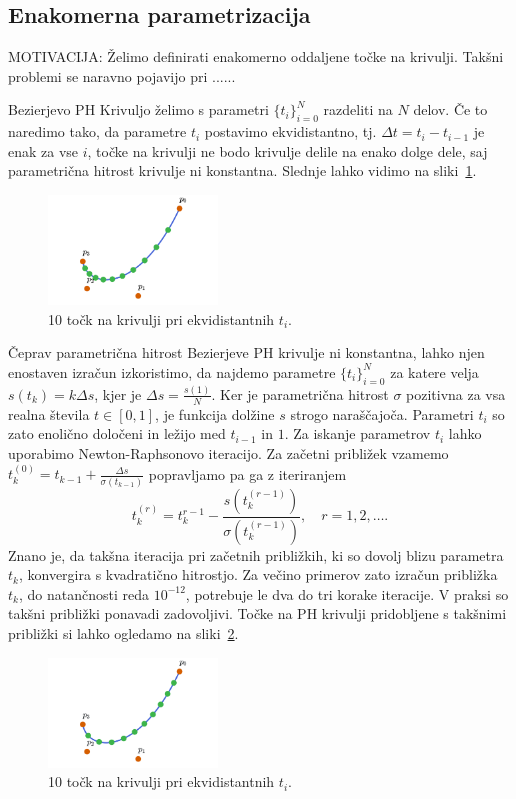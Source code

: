 \documentclass[isrm2, tisk]{fmfdelo}
\begin{document}
    \subsection{Enakomerna parametrizacija}
    MOTIVACIJA: Želimo definirati enakomerno oddaljene točke na krivulji. Takšni problemi se naravno pojavijo pri ...... \newline

    Bezierjevo PH Krivuljo želimo s parametri $\{t_i\}_{i=0}^{N}$ razdeliti na $N$ delov.
    Če to naredimo tako, da parametre $t_i$ postavimo ekvidistantno, tj. $\Delta t=t_i-t_{i-1}$ je enak za vse $i$, točke na krivulji ne bodo krivulje delile na enako dolge dele, saj parametrična hitrost krivulje ni konstantna.
    Slednje lahko vidimo na sliki~\ref{fig:enakomerni-t}.
    \begin{figure}[h]
        \centering
        \includegraphics[width = 0.40\textwidth]{images/enakomerni-t}
        \caption{10 točk na krivulji pri ekvidistantnih $t_i$.}
        \label{fig:enakomerni-t}
    \end{figure}
    Čeprav parametrična hitrost Bezierjeve PH krivulje ni konstantna, lahko njen enostaven izračun izkoristimo, da najdemo parametre $\{t_i\}^{N}_{i=0}$ za katere velja $s(t_k)=k\Delta s$, kjer je $\Delta s = \frac{s(1)}{N}$.
    Ker je parametrična hitrost $\sigma$ pozitivna za vsa realna števila $t\in[0,1]$, je funkcija dolžine $s$ strogo naraščajoča.
    Parametri $t_i$ so zato enolično določeni in ležijo med $t_{i-1}$ in $1$.
    Za iskanje parametrov $t_i$ lahko uporabimo Newton-Raphsonovo iteracijo.
    Za začetni približek vzamemo $t_k^{(0)} = t_{k-1} + \frac{\Delta s}{\sigma(t_{k-1})}$ popravljamo pa ga z iteriranjem
    \[ t_k^{(r)} = t_k^{r-1} - \frac{s(t_k^{(r-1)})}{\sigma(t_k^{(r-1)})}, \quad r=1,2,\ldots .\]
    Znano je, da takšna iteracija pri začetnih približkih, ki so dovolj blizu parametra $t_k$, konvergira s kvadratično hitrostjo.
    Za večino primerov zato izračun približka $t_k$, do natančnosti reda $10^{-12}$, potrebuje le dva do tri korake iteracije.
    V praksi so takšni približki ponavadi zadovoljivi.
    Točke na PH krivulji pridobljene s takšnimi približki si lahko ogledamo na sliki~\ref{fig:enakomerni-s}.
    \begin{figure}[h]
        \centering
        \includegraphics[width = 0.40\textwidth]{images/enakomerni-s}
        \caption{10 točk na krivulji pri ekvidistantnih $t_i$.}
        \label{fig:enakomerni-s}
    \end{figure}
\end{document}
